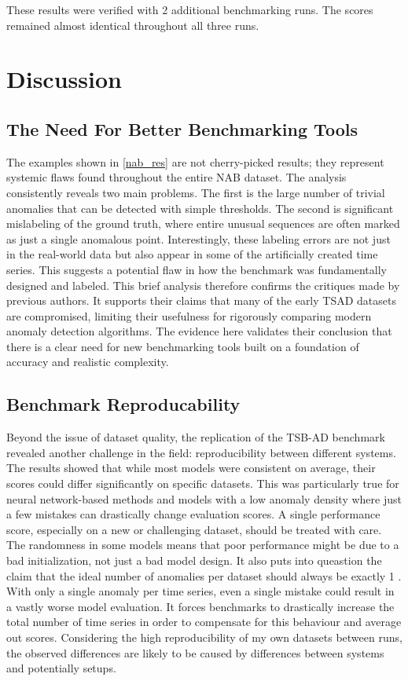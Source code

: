 \documentclass[12pt,oneside]{article}
\begin{document}
These results were verified with 2 additional benchmarking runs. The scores remained almost identical throughout all three runs.

\section{Discussion}

\subsection{The Need For Better Benchmarking Tools}

The examples shown in \ref{nab_res} are not cherry-picked results; they represent systemic flaws found throughout the entire NAB dataset. The analysis consistently reveals two main problems. The first is the large number of trivial anomalies that can be detected with simple thresholds. The second is significant mislabeling of the ground truth, where entire unusual sequences are often marked as just a single anomalous point.
Interestingly, these labeling errors are not just in the real-world data but also appear in some of the artificially created time series. This suggests a potential flaw in how the benchmark was fundamentally designed and labeled.
This brief analysis therefore confirms the critiques made by previous authors. It supports their claims that many of the early TSAD datasets are compromised, limiting their usefulness for rigorously comparing modern anomaly detection algorithms. The evidence here validates their conclusion that there is a clear need for new benchmarking tools built on a foundation of accuracy and realistic complexity.

\subsection{Benchmark Reproducability}

Beyond the issue of dataset quality, the replication of the TSB-AD benchmark revealed another challenge in the field: reproducibility between different systems. The results showed that while most models were consistent on average, their scores could differ significantly on specific datasets. This was particularly true for neural network-based methods and models with a low anomaly density where just a few mistakes can drastically change evaluation scores. A single performance score, especially on a new or challenging dataset, should be treated with care. The randomness in some models means that poor performance might be due to a bad initialization, not just a bad model design. It also puts into queastion the claim that the ideal number of anomalies per dataset should always be exactly 1 \parencite[p.~4]{wu2021current}. With only a single anomaly per time series, even a single mistake could result in a vastly worse model evaluation. It forces benchmarks to drastically increase the total number of time series in order to compensate for this behaviour and average out scores. Considering the high reproducibility of my own datasets between runs, the observed differences are likely to be caused by differences between systems and potentially setups. 
\end{document}
